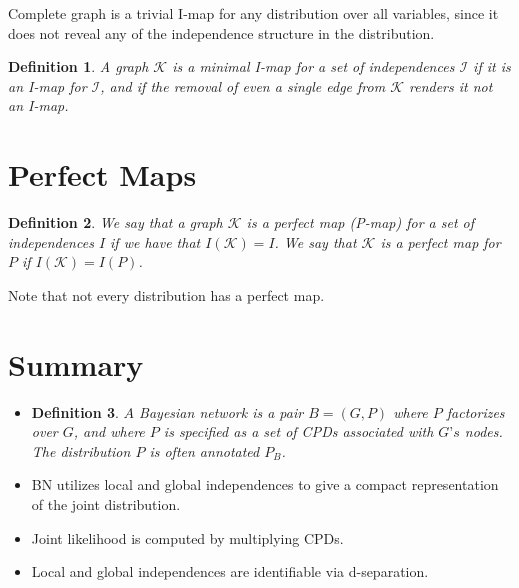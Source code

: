 \documentclass[twoside]{article}
\newtheorem{Defn}{Definition}[section]
\begin{document}
Complete graph is a trivial I-map for any distribution over all variables, since it does not reveal any of the independence structure in the distribution.

\begin{Defn}
A graph \(\mathcal{K}\) is a minimal I-map for a set of independences \(\mathcal{I}\) if it is an I-map for \(\mathcal{I}\), and if the removal of even a single edge from \(\mathcal{K}\) renders it not an I-map.
\end{Defn}

\section{Perfect Maps}

\begin{Defn}
We say that a graph \(\mathcal{K}\) is a perfect map (P-map) for a set of independences \(I\) if we have that \(I(\mathcal{K}) = I\). We say that \(\mathcal{K}\) is a perfect map for \(P\) if \(I(\mathcal{K}) = I(P)\).
\end{Defn}

Note that not every distribution has a perfect map.

\section{Summary}
\begin{itemize}
\item \begin{Defn}
\(A\) Bayesian network is a pair \(B = (G, P)\) where \(P\) factorizes over \(G\), and where \(P\) is specified as a set of CPDs associated with \(G’s\) nodes. The distribution \(P\) is often annotated \(P_B\).
\end{Defn}
\item BN utilizes local and global independences to give a compact representation of the joint distribution.
\item Joint likelihood is computed by multiplying CPDs.
\item Local and global independences are identifiable via d-separation.
\end{itemize}
\end{document}
